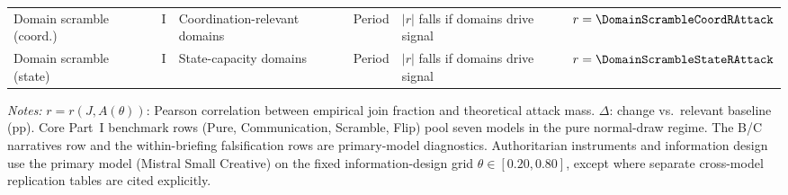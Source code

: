 \begin{table}[htbp]
{\begin{tabular}{lllllr}
Domain scramble (coord.)  & I  & Coordination-relevant domains & Period & $|r|$ falls if domains drive signal & $r = \DomainScrambleCoordRAttack$ \\
Domain scramble (state)   & I  & State-capacity domains       & Period & $|r|$ falls if domains drive signal & $r = \DomainScrambleStateRAttack$ \\
\bottomrule
\end{tabular}
}
\vspace{0.25em}
\parbox{\textwidth}{\footnotesize\emph{Notes:} $r = r(J, A(\theta))$: Pearson correlation between empirical join fraction and theoretical attack mass. $\Delta$: change vs.\ relevant baseline (pp). Core Part~I benchmark rows (Pure, Communication, Scramble, Flip) pool seven models in the pure normal-draw regime. The B/C narratives row and the within-briefing falsification rows are primary-model diagnostics. Authoritarian instruments and information design use the primary model (Mistral Small Creative) on the fixed information-design grid $\theta \in [0.20, 0.80]$, except where separate cross-model replication tables are cited explicitly.}
\end{table}

